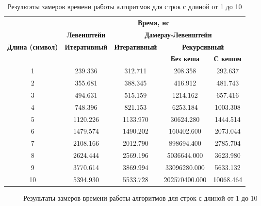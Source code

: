\begin{table}[ht]
	\small
	\begin{center}
		\begin{threeparttable}
			\caption{Результаты замеров времени работы алгоритмов для строк с длиной от 1 до 10}
			\label{tbl:time}
			\begin{tabular}{|c|c|c|c|c|}
				\hline
				& \multicolumn{4}{c|}{\bfseries Время, нс} \\ \cline{2-5}
				& \multicolumn{1}{c|}{\bfseries Левенштейн}
				& \multicolumn{3}{c|}{\bfseries Дамерау-Левенштейн} \\ \cline{2-5}
				\bfseries Длина (символ) & \bfseries Итеративный & \bfseries Итеративный & \multicolumn{2}{c|}{\bfseries Рекурсивный} \\ \cline{4-5}
				& & & \bfseries Без кеша & \bfseries С кешом \\
				\hline
				1 & 239.336 & 312.711 & 208.358 & 292.637 \\
				\hline
				2 & 355.681 & 388.345 & 416.912 & 481.743 \\
				\hline
				3 & 494.631 & 515.159 & 1214.162 & 657.416 \\
				\hline
				4 & 748.396 & 821.153 & 6253.184 & 1003.308 \\
				\hline
				5 &  1120.226 & 1133.970 & 30624.280 & 1444.514 \\
				\hline
				6 & 1479.574 & 1490.202 & 160402.600 & 2073.044 \\
				\hline
				7 & 2108.166 & 2012.790 & 898694.400 & 2785.704 \\
				\hline
				8 & 2624.444 & 2569.196 & 5036644.000 & 3623.980 \\
				\hline
				9 & 3770.614 & 3869.994 & 33096280.000 & 5633.132 \\
				\hline
				10 & 5394.930 & 5533.728 & 202570400.000 & 10068.464 \\
				\hline
			\end{tabular}
		\end{threeparttable}			
	\end{center}
\end{table}


\begin{figure}[h]
	\centering
	
	\caption{Результаты замеров времени работы алгоритмов для строк с длиной от 1 до 10}
	\label{img:linear_graph}
\end{figure}



